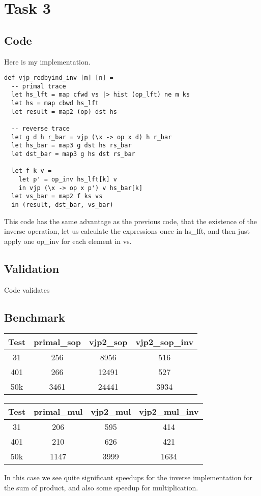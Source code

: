 \documentclass[a4paper,12pt]{article}
\begin{document}
\section*{Task 3}
\subsection*{Code}
Here is my implementation.
\begin{lstlisting}
def vjp_redbyind_inv [m] [n] =
  -- primal trace
  let hs_lft = map cfwd vs |> hist (op_lft) ne m ks
  let hs = map cbwd hs_lft
  let result = map2 (op) dst hs

  -- reverse trace
  let g d h r_bar = vjp (\x -> op x d) h r_bar
  let hs_bar = map3 g dst hs rs_bar
  let dst_bar = map3 g hs dst rs_bar

  let f k v =
    let p' = op_inv hs_lft[k] v
    in vjp (\x -> op x p') v hs_bar[k]
  let vs_bar = map2 f ks vs
  in (result, dst_bar, vs_bar)
\end{lstlisting}
This code has the same advantage as the previous code,
that the existence of the inverse operation, let us calculate the
expressions once in hs\_lft, and then just apply one op\_inv for each
element in vs.
\subsection*{Validation}
Code validates
\subsection*{Benchmark}
\begin{center}
	\begin{tabular}{|c|c|c|c|}
		\hline
		Test & primal\_sop & vjp2\_sop & vjp2\_sop\_inv \\
		\hline
		31   & 256         & 8956      & 516            \\
		\hline
		401  & 266         & 12491     & 527            \\
		\hline
		50k  & 3461        & 24441     & 3934           \\
		\hline
	\end{tabular}
\end{center}
\begin{center}
	\begin{tabular}{|c|c|c|c|}
		\hline
		Test & primal\_mul & vjp2\_mul & vjp2\_mul\_inv \\
		\hline
		31   & 206         & 595       & 414            \\
		\hline
		401  & 210         & 626       & 421            \\
		\hline
		50k  & 1147        & 3999      & 1634           \\
		\hline
	\end{tabular}
\end{center}
In this case we see quite significant speedups for the inverse
implementation for the sum of product, and also some speedup for
multiplication.
\end{document}
